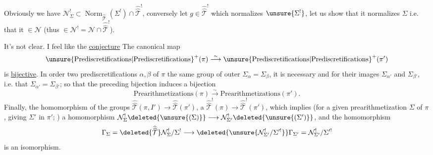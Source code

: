 Obviously we have
$\mathcal N^{!}_{\Sigma}\subset
\operatorname{Norm}_{\widehat{\widehat{\mathcal T}}}(\Sigma^{!})\cap
\widehat{\widehat{\mathcal T}}^{!}$,
conversely let $g\in\widehat{\widehat{\mathcal T}}^{!}$ which normalizes
$\unsure{\Sigma^{!}}$, let us show that it normalizes $\Sigma$ i.e.
that it  $\in\mathcal N$
(thus $\in\mathcal N^{!}=\mathcal N\cap\widehat{\widehat{\mathcal T}}^{!}$).


It's not clear. I  feel like   the
\uline{conjecture} The canonical map
\[
\unsure{\text{Prediscretifications}|\text{Prediscretifications}}^{+}(\pi)
 \overset{\sim}{\longrightarrow}
\unsure{\text{Prediscretifications}|\text{Prediscretifications}}^{+}(\pi')
\]
is \uline{bijective}. In order  two  prediscretifications
$\alpha,\beta$ of $\pi$   the same group of outer 
$\Sigma_\alpha=\Sigma_\beta$,  it is necessary and 
 
for their images $\Sigma_{\alpha'}$ and $\Sigma_{\beta'}$, i.e. that
$\Sigma_{\alpha'}=\Sigma_{\beta'}$; so that the preceding bijection induces a bijection
\[
\text{Prearithmetizations}(\pi)\overset{\sim}{\longrightarrow}\text{Prearithmetizations}(\pi').
\]
Finally, 
the homomorphism of the groups 
$\widehat{\widehat{\mathcal T}}(\pi,I')\longrightarrow\widehat{\widehat{\mathcal T}}(\pi')$,
 
a $\widehat{\widehat{\mathcal T}}^{!}(\pi)\longrightarrow\widehat{\widehat{\mathcal T}}^{!}(\pi')$,
 which implies 
(for a given prearithmetization $\Sigma$ 
of $\pi$, giving $\Sigma'$ 
in $\pi'$; ) a
homomorphism
$\mathcal N_\Sigma^{!}\deleted{\unsure{(\Sigma)}}\longrightarrow
\mathcal N_{\Sigma'}^{!}\deleted{\unsure{(\Sigma')}}$,
 and the  homomorphism
\[
\Gamma_\Sigma=\deleted{\widehat{\widehat{\mathcal T}}}\mathcal N_\Sigma^{!}/\Sigma^{!}
 \longrightarrow
\deleted{\unsure{\mathcal N_{\Sigma'}^{!}/\Sigma'^{!}}}\Gamma_{\Sigma'}=\mathcal N_{\Sigma'}^{!}/\Sigma'^{!}
\]
is an isomorphism.

